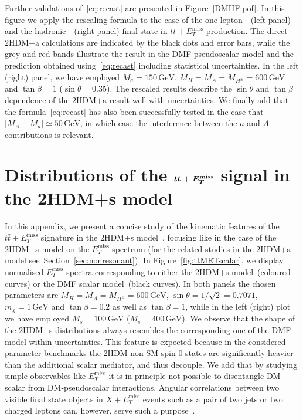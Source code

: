 \documentclass[review]{elsarticle}
\newcommand{\MET}{\ensuremath{E_T^\mathrm{miss}}\xspace}
\newcommand{\mA}{\ensuremath{M_{A}}\xspace}
\newcommand{\ma}{\ensuremath{M_{a}}\xspace}
\newcommand{\mH}{\ensuremath{M_{H}}\xspace}
\newcommand{\mHc}{\ensuremath{M_{H^{\pm}}}\xspace}
\newcommand{\hdma}{\ensuremath{\textrm{2HDM+a}}\xspace}
\def\bm#1{\mbox{\boldmath$#1$\unboldmath}}
\begin{document}
Further validations of~\eqref{eq:recast} are presented in Figure~\ref{DMHF:pof}. In this figure we apply the rescaling formula to the case of the  one-lepton~\cite{Aaboud:2017aeu}~(left panel)   and the hadronic~\cite{Aaboud:2017rzf}~(right panel)  final state in $t \bar t+\MET$ production. The direct \hdma calculations are indicated by the black dots and error bars, while the grey and red  bands illustrate the result in the DMF pseudoscalar model and the prediction obtained using~\eqref{eq:recast} including statistical uncertainties.  In the left (right) panel, we have employed $\ma = 150 \, {\mathrm{GeV}}$, $\mH= \mA = \mHc = 600 \, {\mathrm{GeV}}$ and $\tan \beta = 1$ ($\sin\theta=0.35$). The rescaled results describe the $\sin \theta$ and $\tan \beta$ dependence of the \hdma result well with uncertainties.  We finally add that the formula~\eqref{eq:recast} has also been successfully tested in the case that $|\mA - \ma| \simeq 50 \, {\mathrm{GeV}}$, in which case the interference between the $a$ and $A$ contributions is relevant.  


\section{Distributions of the $\bm{t \bar t + \MET}$ signal in the 2HDM+s model}
\label{app:ttMETscalar}

In this appendix, we present a concise study of the kinematic features of the  $t \bar t + \MET$ signature in the 2HDM+s model~\cite{Bell:2016ekl,Bell:2017rgi}, focusing like in the case of the  \hdma model on the $\MET$ spectrum (for the related studies in the \hdma model see~Section~\ref{sec:nonresonant}).  In Figure~\ref{fig:ttMETscalar}, we display normalised $\MET$ spectra corresponding to either  the 2HDM+s model~(coloured curves) or the DMF scalar   model~(black curves). In both panels the chosen parameters are $M_H = M_A = M_{H^\pm} = 600 \, {\mathrm{GeV}}$, $\sin\theta=1/\sqrt{2}=0.7071$, $m_\chi = 1 \, {\mathrm{GeV}}$ and $\tan \beta = 0.2$ as well as $\tan \beta = 1$, while in the left (right) plot we have employed $M_s = 100 \, {\mathrm{GeV}}$ ($M_s = 400 \, {\mathrm{GeV}}$). We observe that  the shape of the 2HDM+s distributions always  resembles  the corresponding one of the DMF model within uncertainties. This feature is expected because in the considered parameter benchmarks the 2HDM non-SM spin-0 states are significantly heavier than the additional scalar mediator, and thus decouple. We add that by studying simple observables like $\MET$ it is in principle not possible to disentangle DM-scalar from DM-pseudoscalar interactions. Angular correlations between  two visible final state objects in $X+\MET$ events such as a pair of two jets or two charged leptons can, however, serve such a purpose~\cite{Haisch:2016gry,Cotta:2012nj,Haisch:2013fla,Crivellin:2015wva,Haisch:2018bby,Haisch:2018hbm}. 
\end{document}
